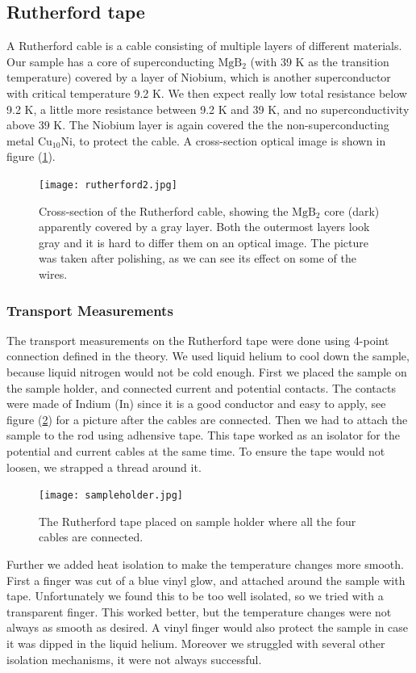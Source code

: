 \documentclass{comjnl}
\newcommand*\chem[1]{\ensuremath{\mathrm{#1}}}
\begin{document}
\subsection{Rutherford tape}
A Rutherford cable is a cable consisting of multiple layers of different materials. Our sample has a core of superconducting \chem{MgB_2} (with 39 K as the transition temperature) covered by a layer of Niobium, which is another superconductor with critical temperature 9.2 K. We then expect really low total resistance below 9.2 K, a little more resistance between 9.2 K and 39 K, and no superconductivity above 39 K. The Niobium layer is again covered the the non-superconducting metal \chem{Cu_{10}Ni}, to protect the cable. A cross-section optical image is shown in figure (\ref{fig:rutherford2}).
\begin{figure}[h]
\centering
\texttt{[image: rutherford2.jpg]}
\caption{Cross-section of the Rutherford cable, showing the \chem{MgB_2} core (dark) apparently covered by a gray layer. Both the outermost layers look gray and it is hard to differ them on an optical image. The picture was taken after polishing, as we can see its effect on some of the wires. \label{fig:rutherford2}}
\end{figure}

\subsubsection{Transport Measurements}
The transport measurements on the Rutherford tape were done using 4-point connection defined in the theory. We used liquid helium to cool down the sample, because liquid nitrogen would not be cold enough. First we placed the sample on the sample holder, and connected current and potential contacts. The contacts were made of Indium (In) since it is a good conductor and easy to apply, see figure (\ref{fig:sampleholder}) for a picture after the cables are connected. Then we had to attach the sample to the rod using adhensive tape. This tape worked as an isolator for the potential and current cables at the same time. To ensure the tape would not loosen, we strapped a thread around it. 

\begin{figure}[h]
\centering
\texttt{[image: sampleholder.jpg]}
\caption{The Rutherford tape placed on sample holder where all the four cables are connected.  \label{fig:sampleholder}}
\end{figure}

Further we added heat isolation to make the temperature changes more smooth. First a finger was cut of a blue vinyl glow, and attached around the sample with tape. Unfortunately we found this to be too well isolated, so we tried with a transparent finger. This worked better, but the temperature changes were not always as smooth as desired. A vinyl finger would also protect the sample in case it was dipped in the liquid helium. Moreover we struggled with several other isolation mechanisms, it were not always successful. 
\end{document}
